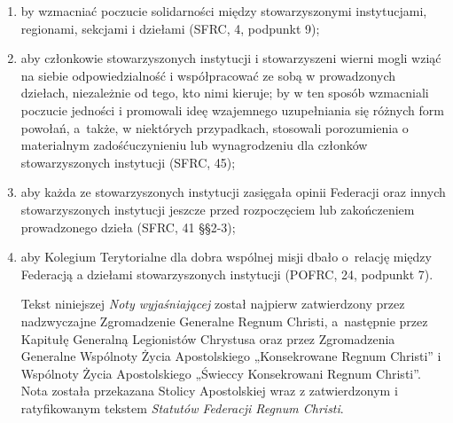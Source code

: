 \begin{enumerate}
\begin{enumerate}
\item by wzmacniać poczucie solidarności między stowarzyszonymi instytucjami, regionami, sekcjami i dziełami (SFRC, 4, podpunkt 9);


\item aby członkowie stowarzyszonych instytucji i stowarzyszeni wierni mogli wziąć na siebie odpowiedzialność i współpracować ze sobą w prowadzonych dziełach, niezależnie od tego, kto nimi kieruje; by w ten sposób wzmacniali poczucie jedności i promowali ideę wzajemnego uzupełniania się różnych form powołań, \mbox{a także}, w niektórych przypadkach, stosowali porozumienia o materialnym zadośćuczynieniu lub wynagrodzeniu dla członków stowarzyszonych instytucji (SFRC, 45);


\item aby każda ze stowarzyszonych instytucji zasięgała opinii Federacji oraz innych stowarzyszonych instytucji jeszcze przed rozpoczęciem lub zakończeniem prowadzonego dzieła (SFRC, 41 \S{}\S{}2-3);


\item aby Kolegium Terytorialne dla dobra wspólnej misji dbało \mbox{o relację} między Federacją a dziełami stowarzyszonych instytucji (POFRC, 24, podpunkt 7).
 
Tekst niniejszej {\em Noty wyjaśniającej} został najpierw zatwierdzony przez nadzwyczajne Zgromadzenie Generalne Regnum Christi, \mbox{a następnie} przez Kapitułę Generalną Legionistów Chrystusa oraz przez Zgromadzenia Generalne Wspólnoty Życia Apostolskiego „Konsekrowane Regnum Christi” i Wspólnoty Życia Apostolskiego „Świeccy Konsekrowani Regnum Christi”. Nota została przekazana Stolicy Apostolskiej wraz z zatwierdzonym i ratyfikowanym tekstem {\em Statutów Federacji Regnum Christi}.


\end{enumerate}


\end{enumerate}
